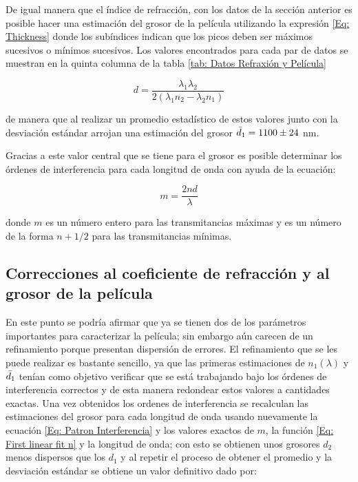 \documentclass[article]{article}
\begin{document}
\begin{multicols}{2}
        De igual manera que el índice de refracción, con los datos de la sección anterior es posible hacer una estimación del grosor de la película utilizando la expresión \ref{Eq: Thickness} donde los subíndices indican que los picos deben ser máximos sucesivos o mínimos sucesivos. Los valores encontrados para cada par de datos se muestran en la quinta columna de la tabla \ref{tab: Datos Refraxión y Película}
        
        \begin{equation}
            d=\frac{\lambda_1 \lambda_2}{2(\lambda_1 n_2 - \lambda_2 n_1)}
            \label{Eq: Thickness}
        \end{equation}
        
        de manera que al realizar un promedio estadístico de estos valores junto con la desviación estándar arrojan una estimación del grosor $\Bar{d}_1=1100\pm24$ nm.
        
        Gracias a este valor central que se tiene para el grosor es posible determinar los órdenes de interferencia para cada longitud de onda con ayuda de la ecuación:
        
        \begin{equation}
            m=\frac{2nd}{\lambda}
            \label{Eq: Patron Interferencia}
        \end{equation}
        
        donde $m$ es un número entero para las transmitancias máximas y es un número de la forma $n+1/2$ para las transmitancias mínimas.

        \subsection{Correcciones al coeficiente de refracción y al grosor de la película}
        
        En este punto se podría afirmar que ya se tienen dos de los parámetros importantes para caracterizar la película; sin embargo aún carecen de un refinamiento porque presentan dispersión de errores. El refinamiento que se les puede realizar es bastante sencillo, ya que las primeras estimaciones de $n_1(\lambda)$ y $\Bar{d}_1$ tenían como objetivo verificar que se está trabajando bajo los órdenes de interferencia correctos y de esta manera redondear estos valores a cantidades exactas. Una vez obtenidos los ordenes de interferencia se recalculan las estimaciones del grosor para cada longitud de onda usando nuevamente la ecuación \ref{Eq: Patron Interferencia} y los valores exactos de $m$, la función \ref{Eq: First linear fit n} y la longitud de onda; con esto se obtienen unos grosores $d_2$ menos dispersos que los $d_1$ y al repetir el proceso de obtener el promedio y la desviación estándar se obtiene un valor definitivo dado por:
        

\end{multicols}
\end{document}
